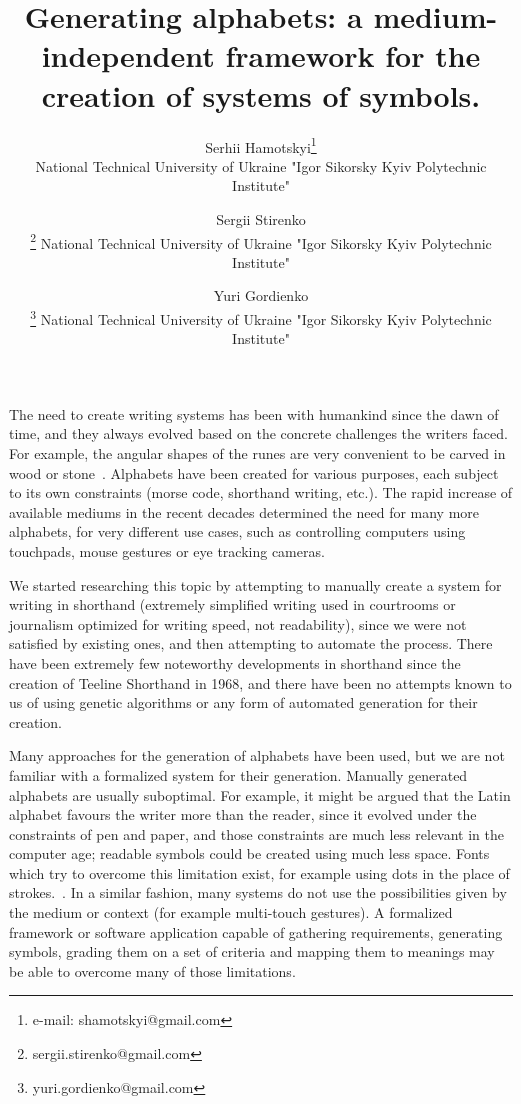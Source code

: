 \documentclass{vgtc}                          %
\title{Generating alphabets: a medium-independent framework for the creation of systems of symbols.}
\author{Serhii Hamotskyi\thanks{e-mail: shamotskyi@gmail.com}\\ %
        \scriptsize National Technical University of Ukraine "Igor Sikorsky Kyiv Polytechnic Institute"\\
\and Sergii Stirenko\\
        \thanks{sergii.stirenko@gmail.com}
        \scriptsize National Technical University of Ukraine "Igor Sikorsky Kyiv Polytechnic Institute"\\
\and Yuri Gordienko\\
        \thanks{yuri.gordienko@gmail.com}
        \scriptsize National Technical University of Ukraine "Igor Sikorsky Kyiv Polytechnic Institute"}
\begin{document}


\maketitle


The need to create writing systems has been with humankind since the dawn of time, and they always evolved based on the concrete challenges the writers faced. For example, the angular shapes of the runes are very convenient to be carved in wood or stone~\cite{williams1996origin}. Alphabets have been created for various purposes, each subject to its own constraints (morse code, shorthand writing, etc.). The rapid increase of available mediums in the recent decades determined the need for many more alphabets, for very different use cases, such as controlling computers using touchpads, mouse gestures or eye tracking cameras. 

We started researching this topic by attempting to manually create a system for writing in shorthand (extremely simplified writing used in courtrooms or journalism optimized for writing speed, not readability), since we were not satisfied by existing ones, and then attempting to automate the process. There have been extremely few noteworthy developments in shorthand since the creation of Teeline Shorthand in 1968, and there have been no attempts known to us of using genetic algorithms or any form of automated generation for their creation.

 Many approaches for the generation of alphabets have been used, but we are not familiar with a formalized system for their generation. Manually generated alphabets are usually suboptimal. For example, it might be argued that the Latin alphabet favours the writer more than the reader, since it evolved under the constraints of pen and paper, and those constraints are much less relevant in the computer age; readable symbols could be created using much less space. Fonts which try to overcome this limitation exist, for example using dots in the place of strokes.~\cite{dotsies}. In a similar fashion, many systems do not use the possibilities given by the medium or context (for example multi-touch gestures). A formalized framework or software application capable of gathering requirements, generating symbols, grading them on a set of criteria and mapping them to meanings may be able to overcome many of those limitations.
\end{document}

